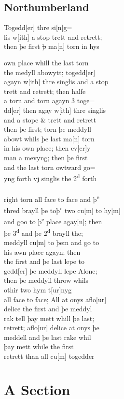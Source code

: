 \documentclass[12pt,letter]{article} %
\newcommand{
\srcpgL}[1]{\noindent{\hspace{-1.85in}\color{Gray}{\rule[0.5ex]{6.0in}{1pt}~#1}}\\
}
\newcommand{\srcpg}[1]{\srcpgL{#1}}
\newcommand{\tmnL}[1]{%
\reversemarginpar\marginparsep=11mm{\marginnote{#1}}
}
\newcommand{\tmn}[1]{
\tmnL{#1}
}
\begin{document}
\subsection{Northumberland}
\tmn{Northhu{[}m{]}b\\land de 3{[}bus{]}}Togedd{[}er{]} thre si{[}n{]}g=\\
lis w{[}ith{]} a stop trett and retrett;\\
then þe first \sout{þ} ma{[}n{]} torn in hys\\
\tmn{Trace}own place whill the last torn\\
the medyll abowytt; togedd{[}er{]}\\
agayn w{[}ith{]} thre singlis and a stop\\
trett and retrett; then halfe\\
a torn and torn agayn 3 toge=\\
dd{[}er{]} then agay w{[}ith{]} thre singlis\\
and a stope \& trett and retrett\\
then þe first; torn þe meddyll\\
abowt whils þe last ma{[}n{]} torn\\
in his own place; then ev{[}er{]}y\\
man a mevyng; then þe first\\
and the last torn owtward go=\\
yng forth vj singlis the 2\textsuperscript{d} forth \\
\srcpg{72}
right torn all face to face and þ\textsuperscript{e}\\
thred brayll þe toþ\textsuperscript{e} two cu{[}m{]} to hy{[}m{]}\\
and goo to þ\textsuperscript{e} place agay{[}n{]}; then\\
þe 3\textsuperscript{d} and þe 2\textsuperscript{d} brayll the;\\
meddyll cu{[}m{]} to þem and go to\\
his awn place agayn; then\\
the first and þe last lepe to\\
gedd{[}er{]} þe meddyll lepe Alone;\\
then þe meddyll throw whils\\
othir two hym t{[}ur{]}nyg\\
all face to face; All at onys aflo{[}ur{]}\\
delice the first and þe meddyl\\
rak tell þay mett whill þe last;\\
retrett; aflo{[}ur{]} delice at onys þe\\
meddell and þe last rake whil\\
þay mett while the first\\
retrett than all cu{[}m{]} togedder

\newpage

    \section{A Section}
    \lipsum[1]
    
    \nocite{*}
    
    
\end{document}
